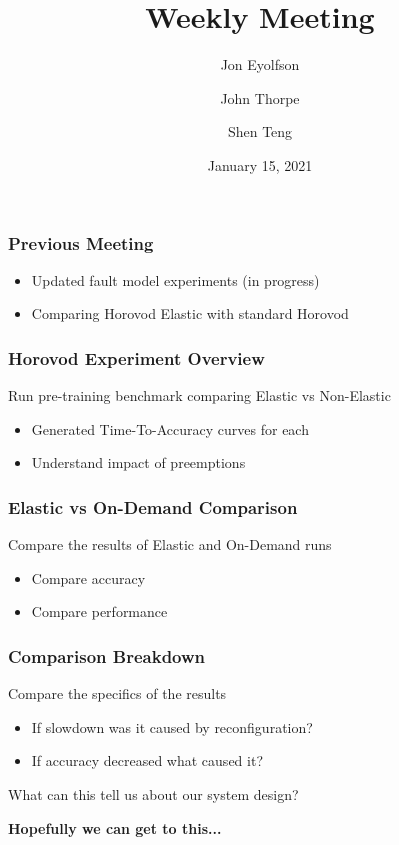 
\title{Weekly Meeting}
\date{January 15, 2021}
\author{Jon Eyolfson \and John Thorpe \and Shen Teng}



  \begin{frame}[plain]
    \titlepage
  \end{frame}

  \setcounter{framenumber}{0}

  \begin{frame}
    \frametitle{Previous Meeting}

    \begin{itemize}
      \item Updated fault model experiments (in progress)
      \item Comparing Horovod Elastic with standard Horovod
    \end{itemize}
  \end{frame}

  \begin{frame}
    \begin{center}
      
    \end{center}
  \end{frame}

  \begin{frame}
    \frametitle{Horovod Experiment Overview}

    Run pre-training benchmark comparing Elastic vs Non-Elastic
    \begin{itemize}
      \item Generated Time-To-Accuracy curves for each
      \item Understand impact of preemptions
    \end{itemize}
  \end{frame}

  \begin{frame}
    \frametitle{Elastic vs On-Demand Comparison}

    Compare the results of Elastic and On-Demand runs
    \begin{itemize}
      \item Compare accuracy
      \item Compare performance
    \end{itemize}
  \end{frame}

  \begin{frame}
    \frametitle{Comparison Breakdown}

    Compare the specifics of the results
    \begin{itemize}
      \item If slowdown was it caused by reconfiguration?
      \item If accuracy decreased what caused it?
    \end{itemize}

    \vspace{1em}
    What can this tell us about our system design?

    \vspace{1em}
    \textbf{Hopefully we can get to this...}
  \end{frame}


